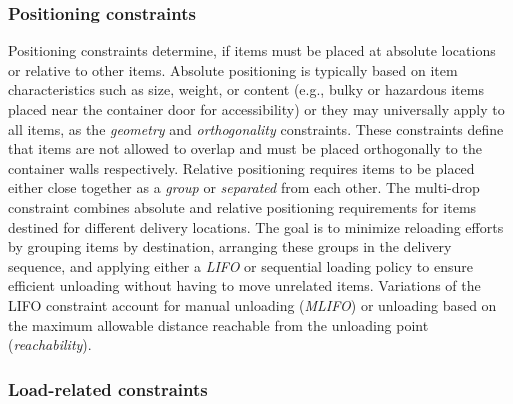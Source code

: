 \subsubsection{Positioning constraints}

Positioning constraints determine, if items must be placed at
absolute locations or relative to other items. Absolute positioning is
typically based on item characteristics such as size, weight, or
content (e.g., bulky or hazardous items placed near the container door for accessibility) or
they may universally apply to all items, as the \textit{geometry} and
\textit{orthogonality} constraints. These constraints define that items are not allowed to overlap
and must be placed orthogonally to the container walls respectively.
Relative positioning requires items to be placed either close together as a \textit{group} or
\textit{separated} from each other.
The multi-drop constraint combines absolute and relative positioning requirements for items
destined for different delivery locations. The goal is to minimize reloading efforts by grouping items
by destination, arranging these groups in the delivery sequence, and applying either a \textit{\gls{LIFO}}
or sequential loading policy to ensure efficient unloading without having to move unrelated items.
Variations of the \gls{LIFO} constraint account for manual unloading (\textit{\gls{MLIFO}}) or unloading based on the
maximum allowable distance reachable from the unloading point (\textit{reachability}).

\subsubsection{Load-related constraints}

